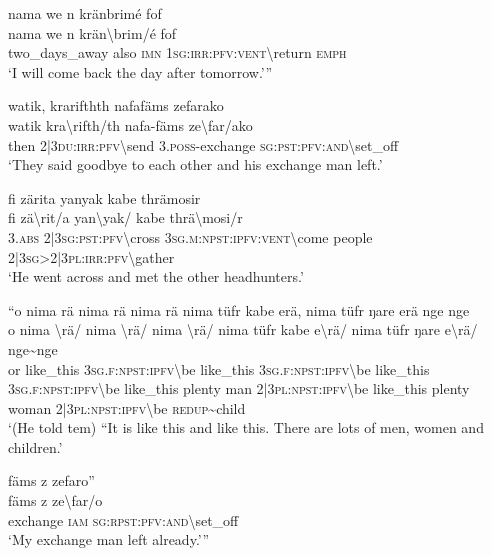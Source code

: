 \ea\label{ex:5:a1530}
nama we n kränbrimé fof\\
\gll nama	we	n	krän{\textbackslash}brim/é	fof\\
     two\_days\_away	also	\textsc{imn}	1\textsc{sg}:\textsc{irr}:\textsc{pfv}:\textsc{vent}{\textbackslash}return	\textsc{emph}\\
\glt `I will come back the day after tomorrow.'''
\z

\ea\label{ex:5:a1531}
watik, krarifthth nafafäms zefarako\\
\gll watik	kra{\textbackslash}rifth/th	nafa-fäms	ze{\textbackslash}far/ako\\
     then	2|3\textsc{du}:\textsc{irr}:\textsc{pfv}{\textbackslash}send	3.\textsc{poss}-exchange	\textsc{sg}:\textsc{pst}:\textsc{pfv}:\textsc{and}{\textbackslash}set\_off\\
\glt `They said goodbye to each other and his exchange man left.'
\z

\ea\label{ex:5:a1532}
fi zärita yanyak kabe thrämosir\\
\gll fi	zä{\textbackslash}rit/a	yan{\textbackslash}yak/	kabe	thrä{\textbackslash}mosi/r\\
     3.\textsc{abs}	2|3\textsc{sg}:\textsc{pst}:\textsc{pfv}{\textbackslash}cross	3\textsc{sg}.\textsc{m}:\textsc{npst}:\textsc{ipfv}:\textsc{vent}{\textbackslash}come	people	2|3\textsc{sg}>2|3\textsc{pl}:\textsc{irr}:\textsc{pfv}{\textbackslash}gather\\
\glt `He went across and met the other headhunters.'
\z

\ea\label{ex:5:a1534}
``o nima rä nima rä nima rä nima tüfr kabe erä, nima tüfr ŋare erä nge nge\\
\gll o	nima	{\textbackslash}rä/	nima	{\textbackslash}rä/	nima	{\textbackslash}rä/	nima	tüfr	kabe	e{\textbackslash}rä/	nima	tüfr	ŋare	e{\textbackslash}rä/	nge{\textasciitilde}nge\\
     or	like\_this	3\textsc{sg}.\textsc{f}:\textsc{npst}:\textsc{ipfv}{\textbackslash}be	like\_this	3\textsc{sg}.\textsc{f}:\textsc{npst}:\textsc{ipfv}{\textbackslash}be	like\_this	3\textsc{sg}.\textsc{f}:\textsc{npst}:\textsc{ipfv}{\textbackslash}be	like\_this	plenty	man	2|3\textsc{pl}:\textsc{npst}:\textsc{ipfv}{\textbackslash}be	like\_this	plenty	woman	2|3\textsc{pl}:\textsc{npst}:\textsc{ipfv}{\textbackslash}be	\textsc{redup}{\textasciitilde}child\\
\glt `(He told tem) ``It is like this and like this. There are lots of men, women and children.'
\z

\ea\label{ex:5:a1537}
fäms z zefaro''\\
\gll fäms	z	ze{\textbackslash}far/o\\
     exchange	\textsc{iam}	\textsc{sg}:\textsc{rpst}:\textsc{pfv}:\textsc{and}{\textbackslash}set\_off\\
\glt `My exchange man left already.'''
\z

